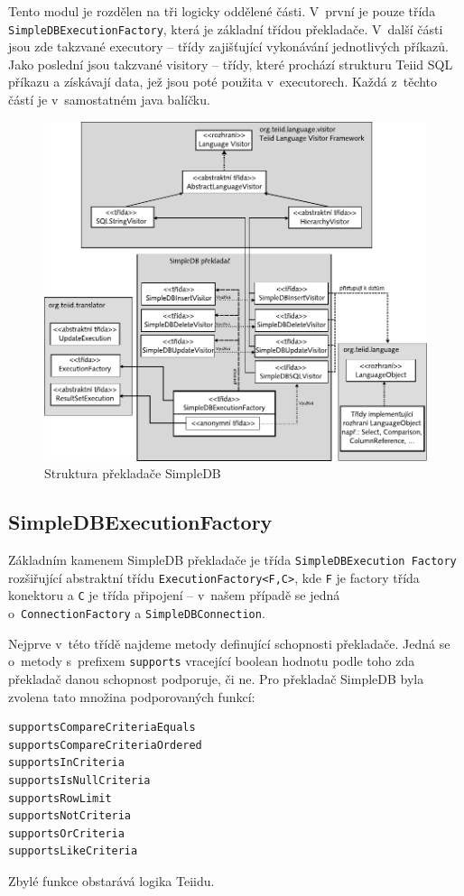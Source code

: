 \documentclass[oneside,12pt]{fithesis2}
\begin{document}
Tento modul je rozdělen na tři logicky oddělené části. V~první je pouze třída \texttt{SimpleDBExecutionFactory}, která je základní třídou překladače. V~další části jsou zde takzvané executory -- třídy zajišťující vykonávání jednotlivých příkazů. Jako poslední jsou takzvané visitory -- třídy, které prochází strukturu Teiid SQL příkazu a získávají data, jež jsou poté použita v~executorech. Každá z~těchto částí je v~samostatném java balíčku.
\begin{figure}[h]
 \centering
 \includegraphics[scale=0.8]{TranslatorStructure}
 \caption{Struktura překladače SimpleDB}
\end{figure}
\subsection{SimpleDBExecutionFactory}
Základním kamenem SimpleDB překladače je třída \texttt{SimpleDBExecution Factory} rozšiřující abstraktní třídu \texttt{ExecutionFactory<F,C>}, kde \texttt{F} je factory třída konektoru a \texttt{C} je třída připojení -- v~našem případě se jedná o~\texttt{ConnectionFactory} a \texttt{SimpleDBConnection}.

Nejprve v~této třídě najdeme metody definující schopnosti překladače. Jedná se o~metody s~prefixem \texttt{supports} vracející boolean hodnotu podle toho zda překladač danou schopnost podporuje, či ne. Pro překladač SimpleDB byla zvolena tato množina podporovaných funkcí: 
\begin{verbatim}
supportsCompareCriteriaEquals
supportsCompareCriteriaOrdered
supportsInCriteria
supportsIsNullCriteria
supportsRowLimit
supportsNotCriteria
supportsOrCriteria
supportsLikeCriteria
\end{verbatim}
Zbylé funkce obstarává logika Teiidu.
\end{document}
